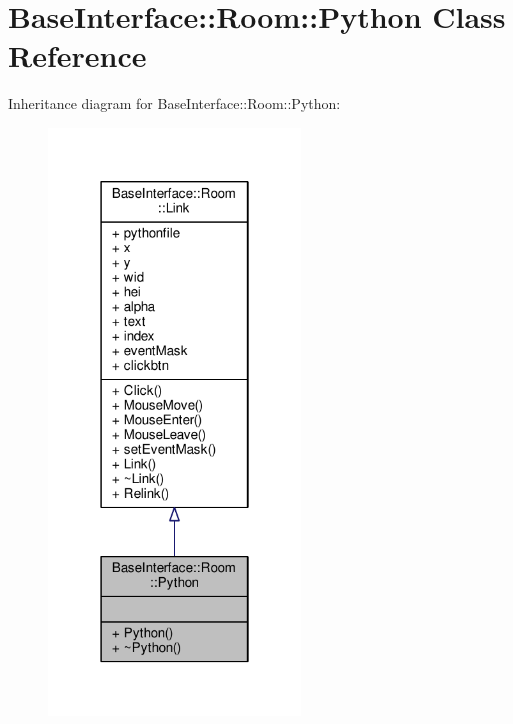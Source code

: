 \hypertarget{classBaseInterface_1_1Room_1_1Python}{}\section{Base\+Interface\+:\+:Room\+:\+:Python Class Reference}
\label{classBaseInterface_1_1Room_1_1Python}


Inheritance diagram for Base\+Interface\+:\+:Room\+:\+:Python\+:
\nopagebreak
\begin{figure}[H]
\begin{center}
\leavevmode
\includegraphics[width=190pt]{df/d15/classBaseInterface_1_1Room_1_1Python__inherit__graph}
\end{center}
\end{figure}


